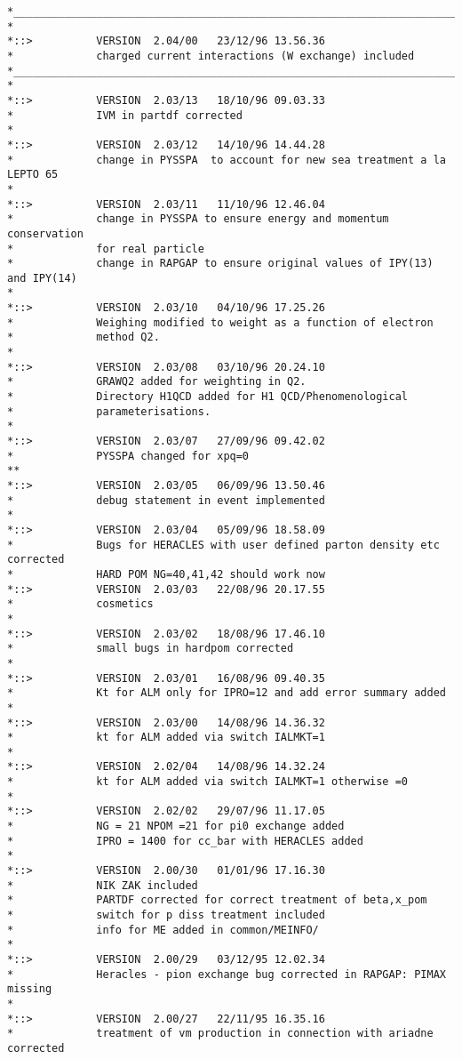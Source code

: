 \documentclass[10pt]{article} \usepackage{dina4}
\begin{document}
\begin{verbatim}
*________________________________________________________________________
*
*::>          VERSION  2.04/00   23/12/96 13.56.36
*             charged current interactions (W exchange) included
*________________________________________________________________________
*
*::>          VERSION  2.03/13   18/10/96 09.03.33
*             IVM in partdf corrected
*
*::>          VERSION  2.03/12   14/10/96 14.44.28
*             change in PYSSPA  to account for new sea treatment a la LEPTO 65
*
*::>          VERSION  2.03/11   11/10/96 12.46.04
*             change in PYSSPA to ensure energy and momentum conservation
*             for real particle
*             change in RAPGAP to ensure original values of IPY(13) and IPY(14)
*
*::>          VERSION  2.03/10   04/10/96 17.25.26
*             Weighing modified to weight as a function of electron
*             method Q2. 
*
*::>          VERSION  2.03/08   03/10/96 20.24.10
*             GRAWQ2 added for weighting in Q2.
*             Directory H1QCD added for H1 QCD/Phenomenological
*             parameterisations.
*
*::>          VERSION  2.03/07   27/09/96 09.42.02
*             PYSSPA changed for xpq=0
**
*::>          VERSION  2.03/05   06/09/96 13.50.46
*             debug statement in event implemented
*
*::>          VERSION  2.03/04   05/09/96 18.58.09
*             Bugs for HERACLES with user defined parton density etc corrected
*             HARD POM NG=40,41,42 should work now
*::>          VERSION  2.03/03   22/08/96 20.17.55
*             cosmetics
*
*::>          VERSION  2.03/02   18/08/96 17.46.10
*             small bugs in hardpom corrected
*
*::>          VERSION  2.03/01   16/08/96 09.40.35
*             Kt for ALM only for IPRO=12 and add error summary added
*
*::>          VERSION  2.03/00   14/08/96 14.36.32
*             kt for ALM added via switch IALMKT=1
*
*::>          VERSION  2.02/04   14/08/96 14.32.24
*             kt for ALM added via switch IALMKT=1 otherwise =0
*
*::>          VERSION  2.02/02   29/07/96 11.17.05
*             NG = 21 NPOM =21 for pi0 exchange added
*             IPRO = 1400 for cc_bar with HERACLES added
*
*::>          VERSION  2.00/30   01/01/96 17.16.30
*             NIK ZAK included
*             PARTDF corrected for correct treatment of beta,x_pom
*             switch for p diss treatment included
*             info for ME added in common/MEINFO/
*
*::>          VERSION  2.00/29   03/12/95 12.02.34
*             Heracles - pion exchange bug corrected in RAPGAP: PIMAX missing
*
*::>          VERSION  2.00/27   22/11/95 16.35.16
*             treatment of vm production in connection with ariadne corrected

\end{verbatim}
\end{document}
